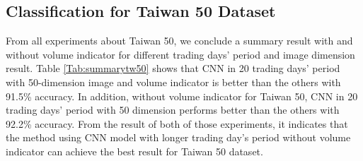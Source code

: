 \documentclass[12pt]{article}
\begin{document}
\subsection{Classification for Taiwan 50 Dataset}
\begin{table}[H]
 \centering
 \caption{Summary result of Taiwan 50 with their best classifier for each trading days and image dimension.}
 \label{Tab:summarytw50}
 \end{table}
From all experiments about Taiwan 50, we conclude a summary result with and without volume indicator for different trading days’ period and image dimension result. Table \ref{Tab:summarytw50} shows that CNN in 20 trading days’ period with 50-dimension image and volume indicator is better than the others with 91.5\% accuracy. In addition, without volume indicator for Taiwan 50, CNN in 20 trading days’ period with 50 dimension performs better than the others with 92.2\% accuracy. From the result of both of those experiments, it indicates that the method using CNN model with longer trading day’s period without volume indicator can achieve the best result for Taiwan 50 dataset.
\end{document}
